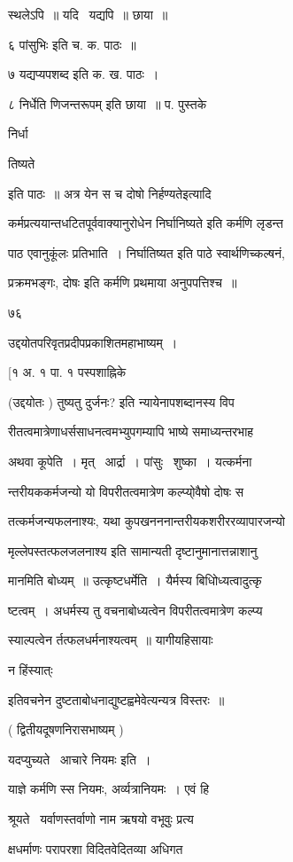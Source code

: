 \documentclass[11pt, openany]{book}
\begin{document}
स्थलेऽपि~॥ यदि \textendash\ यद्यपि~॥ छाया~॥ 

६ {\qt पांसुभिः} इति च. क. पाठः~॥ 

७ {\qt यद्यप्यपशब्द} इति क. ख. पाठः~। 

८ {\qt निर्धेति णिजन्तरूपम्} इति छाया~॥ प. पुस्तके {\qt निर्धा \textendash\ 

तिष्यते} इति पाठः~॥ अत्र {\qt येन स च दोषो निर्हण्यते}इत्यादि \textendash\ 

कर्मप्रत्ययान्तधटितपूर्ववाक्यानुरोधेन {\qt निर्घानिष्यते} इति कर्मणि
लृडन्त \textendash\ 

पाठ एवानुकूंलः प्रतिभाति~। निर्घातिष्यत इति पाठे स्वार्थणिच्कल्षनं, 

प्रक्रमभङ्गः, {\qt दोषः} इति कर्मणि प्रथमाया अनुपपत्तिश्च~॥ 

७६ 

उद्दयोतपरिवृतप्रदीपप्रकाशितमहाभाष्यम्~। 

[१ अ. १ पा. १ पस्पशाह्निके 

(उद्दयोतः ) {\qt तुष्यतु दुर्जनः?} इति न्यायेनापशब्दानस्य विप \textendash\ 

रीतत्वमात्रेणाधर्ससाधनत्वमभ्युपगम्यापि भाष्ये समाध्यन्तरभाह \textendash\ 

अथवा कूपेति~। मृत् \textendash\ आर्द्रा~। पांसुः \textendash\ शुष्का~। यत्कर्मना \textendash\ 

न्तरीयककर्मजन्यो यो विपरीतत्वमात्रेण कल्प्यो्वैषो दोषः स 

तत्कर्मजन्यफलनाश्यः, यथा कुपखनननान्तरीयकशरीररव्यापारजन्यो 

मृल्लेपस्तत्फलजलनाश्य इति सामान्यती दृष्टानुमानात्तन्नाशानु \textendash\ 

मानमिति बोध्यम्~॥ उत्कृष्टधर्मेति~। यैर्मस्य बिधिोध्यत्वादुत्कृ \textendash\ 

ष्टत्वम्~। अधर्मस्य तु वचनाबोध्यत्वेन विपरीतत्वमात्रेण कल्प्य \textendash\ 

स्याल्पत्वेन र्तत्फलधर्मनाश्यत्वम्~॥ यागीयहिसायाः {\qt न हिंस्यात्ः 

इतिवचनेन दुष्टताबोधनाद्युष्टह्वमेवेत्यन्यत्र विस्तरः~॥}

( द्वितीयदूषणनिरासभाष्यम् ) 

यदप्युच्यते \textendash\ आचारे नियमः इति~। 

याज्ञे कर्मणि स्स नियमः, अर्व्यत्रानियमः~। एवं हि 

श्रूयते \textendash\ {\qt यर्वाणस्तर्वाणो नाम ऋषयो वभूवुः प्रत्य} \textendash\ 

क्षधर्माणः परापरशा विदितवेदितव्या अधिगत \textendash\ 
\end{document}

